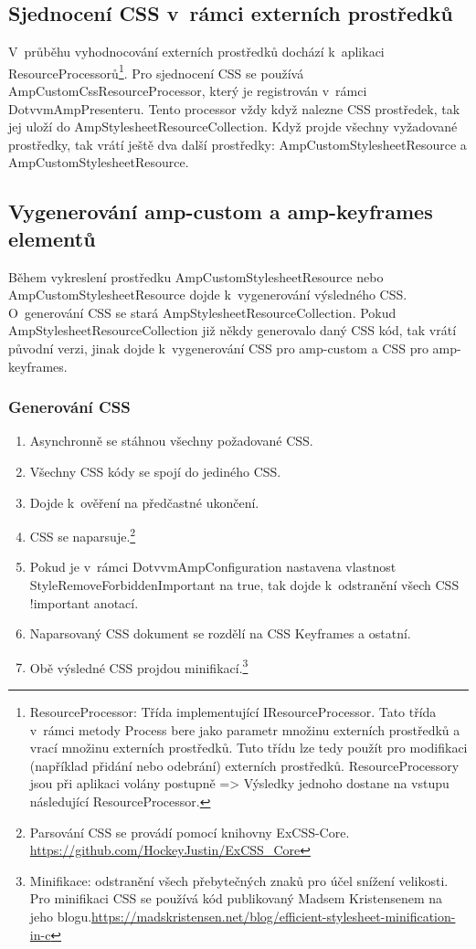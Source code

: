 \subsection*{Sjednocení CSS v~rámci externích prostředků}
V~průběhu vyhodnocování externích prostředků dochází k~aplikaci ResourceProcessorů\footnote{ResourceProcessor: Třída implementující IResourceProcessor. Tato třída v~rámci metody Process bere jako parametr množinu externích prostředků a vrací množinu externích prostředků. Tuto třídu lze tedy použít pro modifikaci (například přidání nebo odebrání) externích prostředků. ResourceProcessory jsou při aplikaci volány postupně => Výsledky jednoho dostane na vstupu následující ResourceProcessor.}. Pro sjednocení CSS se používá AmpCustomCssResourceProcessor, který je registrován v~rámci DotvvmAmpPresenteru. Tento processor vždy když nalezne CSS prostředek, tak jej uloží do AmpStylesheetResourceCollection. Když projde všechny vyžadované prostředky, tak vrátí ještě dva další prostředky: AmpCustomStylesheetResource a AmpCustomStylesheetResource.

\subsection*{Vygenerování amp-custom a amp-keyframes elementů}
Během vykreslení prostředku AmpCustomStylesheetResource nebo AmpCustomStylesheetResource dojde k~vygenerování výsledného CSS. O~generování CSS se stará AmpStylesheetResourceCollection. Pokud AmpStylesheetResourceCollection již někdy generovalo daný CSS kód, tak vrátí původní verzi, jinak dojde k~vygenerování CSS pro amp-custom a CSS  pro amp-keyframes.

\subsubsection*{Generování CSS}
\begin{enumerate}
    \item Asynchronně se stáhnou všechny požadované CSS.
    \item Všechny CSS kódy se spojí do jediného CSS.
    \item Dojde k~ověření na předčastné ukončení.
    \item CSS se naparsuje.\footnote{Parsování CSS se provádí pomocí knihovny ExCSS-Core. \newline \url{https://github.com/HockeyJustin/ExCSS_Core}}
    \item Pokud je v~rámci DotvvmAmpConfiguration nastavena vlastnost StyleRemoveForbiddenImportant na true, tak dojde k~odstranění všech CSS !important anotací. 
    \item Naparsovaný CSS dokument se rozdělí na CSS Keyframes a ostatní.
    \item Obě výsledné CSS projdou minifikací.\footnote{Minifikace: odstranění všech přebytečných znaků pro účel snížení velikosti. \newline Pro minifikaci CSS se používá kód publikovaný Madsem Kristensenem na jeho blogu.\newline \url{https://madskristensen.net/blog/efficient-stylesheet-minification-in-c}}
\end{enumerate}

